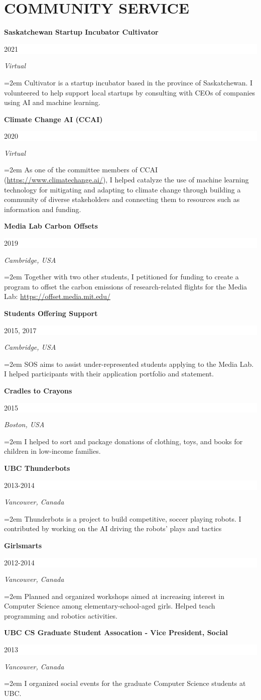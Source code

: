 \documentclass[paper=letter,fontsize=11pt]{scrartcl} %
\newcommand{\sepspace}{\vspace*{1em}}       %
\newcommand{\NewPart}[2]{\section*{\uppercase{#1} #2}}
\newcommand{\EducationEntry}[3]{
        \noindent \textbf{#1} \hfill      %
        \colorbox{White}{%
            \parbox{10em}{%
            \hfill\color{Black}#2}} \par  %
        \noindent \textit{#3} \par}
\newcommand{\ServiceEntry}[4]{
        \noindent \textbf{#1} \hfill      %
        \colorbox{White}{%
            \parbox{10em}{%
            \hfill\color{Black}#2}} \par  %
        \noindent \textit{#3} \par  %
        \noindent\hangindent=2em\hangafter=0 \small #4 %
        \normalsize \par}
\begin{document}
\NewPart{Community Service}{}



\ServiceEntry{Saskatchewan Startup Incubator Cultivator}{2021}{Virtual}
{Cultivator is a startup incubator based in the province of Saskatchewan. I volunteered to help support local startups by consulting with CEOs of companies using AI and machine learning.}
\sepspace

\ServiceEntry{Climate Change AI (CCAI)}{2020}{Virtual}
{As one of the committee members of CCAI (\url{https://www.climatechange.ai/}), I helped catalyze the use of machine learning technology for mitigating and adapting to climate change through building a community of diverse stakeholders and connecting them to resources such as information and funding.}
\sepspace

\ServiceEntry{Media Lab Carbon Offsets}{2019}{Cambridge, USA}
{Together with two other students, I petitioned for funding to create a program to offset the carbon emissions of research-related flights for the Media Lab: \url{https://offset.media.mit.edu/}}
\sepspace

\ServiceEntry{Students Offering Support}{2015, 2017}{Cambridge, USA}
{SOS aims to assist under-represented students applying to the Media Lab. I helped participants with their application portfolio and statement.}
\sepspace

\ServiceEntry{Cradles to Crayons}{2015}{Boston, USA}
{I helped to sort and package donations of clothing, toys, and books for children in low-income families.}
\sepspace

\ServiceEntry{UBC Thunderbots}{2013-2014}{Vancouver, Canada}
{Thunderbots is a project to build competitive, soccer playing robots. I contributed by working on the AI driving the robots' plays and tactics}
\sepspace

\ServiceEntry{Girlsmarts}{2012-2014}{Vancouver, Canada}
{Planned and organized workshops aimed at increasing interest in Computer Science among elementary-school-aged girls. Helped teach programming and robotics activities.}
\sepspace

\ServiceEntry{UBC CS Graduate Student Assocation - Vice President, Social }{2013}{Vancouver, Canada}
{I organized social events for the graduate Computer Science students at UBC.}
\sepspace
\end{document}
